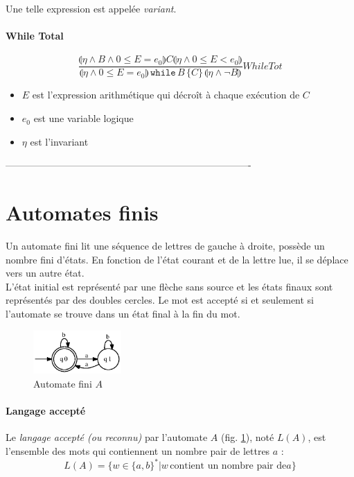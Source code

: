 \documentclass[a4paper]{article}
\begin{document}
  Une telle expression est appelée \textit{variant}.

  \paragraph{While Total}
  $$
    \frac{
      \llparenthesis\eta\land B \land 0 \leq E = e_0 \rrparenthesis
      C
      \llparenthesis\eta\land 0 \leq E < e_0 \rrparenthesis
    }
    {
      \llparenthesis\eta\land 0 \leq E = e_0 \rrparenthesis\,
      \texttt{while}\, B\, \{C\}\,
      \llparenthesis\eta\land\lnot B\rrparenthesis
    } WhileTot
  $$
  \begin{itemize}
    \item $E$ est l'expression arithmétique qui décroît à chaque 
exécution de $C$
    \item $e_0$ est une variable logique
    \item $\eta$ est l'invariant
  \end{itemize}


% 
---------------------------------------------------------------------------- 
%
\section{Automates finis}
  Un automate fini lit une séquence de lettres de gauche à droite, 
possède un 
  nombre fini d'états. En fonction de l'état courant et de la lettre 
lue, il se
  déplace vers un autre état.\\

  L'état initial est représenté par une flèche sans source et les états 
finaux
  sont représentés par des doubles cercles. Le mot est accepté si et 
seulement si
  l'automate se trouve dans un état final à la fin du mot.

  \begin{figure}[H]
    \begin{center}
      \includegraphics[width=0.3\textwidth]{fsa/fsa1.eps}
      \caption{Automate fini $A$}
      \label{fig:fsa:1}
    \end{center}
  \end{figure}

  \paragraph{Langage accepté} Le \textit{langage accepté (ou reconnu)} 
par
  l'automate $A$ (fig. \ref{fig:fsa:1}), noté $L(A)$, est l'ensemble des 
mots
  qui contiennent un nombre pair de lettres $a$ :
  $$ L(A) = \{ w \in \{a,b\}^* | w\, \text{contient un nombre pair de} a 
\}$$
\end{document}
